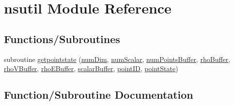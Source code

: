 \hypertarget{namespacensutil}{}\section{nsutil Module Reference}
\label{namespacensutil}
\subsection*{Functions/\+Subroutines}
\begin{DoxyCompactItemize}
\item 
subroutine \hyperlink{namespacensutil_a503864a1d099dac98243d4e3b7b3137b}{getpointstate} (\hyperlink{SATKernels_8H_a680185db8546de161968dabace9e94f1}{num\+Dim}, \hyperlink{SATKernels_8H_ac97409f480a745850ce5b215aabef12a}{num\+Scalar}, \hyperlink{WENOKernels_8H_a86c25ff33e6d9bccfabdf45dc5ddf24c}{num\+Points\+Buffer}, \hyperlink{WENOKernels_8H_a7f8551332dfedc9c12724ab3903db88c}{rho\+Buffer}, \hyperlink{WENOKernels_8H_aaddaafee4b407fa52d0756171ec50a51}{rho\+V\+Buffer}, \hyperlink{WENOKernels_8H_a355f99edd58be395aedbe083ffca12b0}{rho\+E\+Buffer}, \hyperlink{WENOKernels_8H_ae53b6c0ad2686009b00d987ad35f4810}{scalar\+Buffer}, \hyperlink{NSUtilKernels_8H_acde79891dbc4fd8e02d5c1ff00f990a5}{point\+ID}, \hyperlink{NSUtilKernels_8H_afef8a617804a12ae0e3b9a7f8a9cec81}{point\+State})
\end{DoxyCompactItemize}


\subsection{Function/\+Subroutine Documentation}
\hypertarget{namespacensutil_a503864a1d099dac98243d4e3b7b3137b}{}\label{namespacensutil_a503864a1d099dac98243d4e3b7b3137b} 
